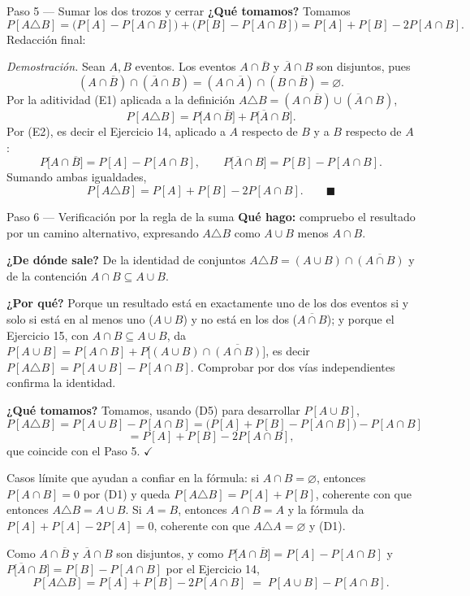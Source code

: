\documentclass[11pt]{article}
\begin{document}
\begin{sol}
\begin{paso}{Paso 5 --- Sumar los dos trozos y cerrar}
\textbf{¿Qué tomamos?} Tomamos
\[
P[A\triangle B]=\big(P[A]-P[A\cap B]\big)+\big(P[B]-P[A\cap B]\big)
=P[A]+P[B]-2P[A\cap B].
\]
Redacción final:

\medskip
\emph{Demostración.} Sean $A,B$ eventos. Los eventos $A\cap\overline{B}$ y $\overline{A}\cap B$
son disjuntos, pues
\[
(A\cap\overline{B})\cap(\overline{A}\cap B)=(A\cap\overline{A})\cap(B\cap\overline{B})=\varnothing .
\]
Por la aditividad (E1) aplicada a la definición
$A\triangle B=(A\cap\overline{B})\cup(\overline{A}\cap B)$,
\[
P[A\triangle B]=P\big[A\cap\overline{B}\big]+P\big[\overline{A}\cap B\big].
\]
Por (E2), es decir el Ejercicio 14, aplicado a $A$ respecto de $B$ y a $B$ respecto de $A$:
\[
P\big[A\cap\overline{B}\big]=P[A]-P[A\cap B],
\qquad
P\big[\overline{A}\cap B\big]=P[B]-P[A\cap B].
\]
Sumando ambas igualdades,
\[
P[A\triangle B]=P[A]+P[B]-2P[A\cap B]. \qquad\blacksquare
\]
\end{paso}

\begin{paso}{Paso 6 --- Verificación por la regla de la suma}
\textbf{Qué hago:} compruebo el resultado por un camino alternativo, expresando $A\triangle B$
como $A\cup B$ menos $A\cap B$.

\textbf{¿De dónde sale?} De la identidad de conjuntos
$A\triangle B=(A\cup B)\cap\overline{(A\cap B)}$ y de la contención $A\cap B\subseteq A\cup B$.

\textbf{¿Por qué?} Porque un resultado está en exactamente uno de los dos eventos si y solo si
está en al menos uno ($A\cup B$) y no está en los dos ($\overline{A\cap B}$); y porque el
Ejercicio 15, con $A\cap B\subseteq A\cup B$, da
$P[A\cup B]=P[A\cap B]+P\big[(A\cup B)\cap\overline{(A\cap B)}\big]$, es decir
$P[A\triangle B]=P[A\cup B]-P[A\cap B]$. Comprobar por dos vías independientes confirma la
identidad.

\textbf{¿Qué tomamos?} Tomamos, usando (D5) para desarrollar $P[A\cup B]$,
\[
P[A\triangle B]=P[A\cup B]-P[A\cap B]
=\big(P[A]+P[B]-P[A\cap B]\big)-P[A\cap B]
\]
\[
=P[A]+P[B]-2P[A\cap B],
\]
que coincide con el Paso 5. $\checkmark$
\end{paso}

\begin{nota}
Casos límite que ayudan a confiar en la fórmula: si $A\cap B=\varnothing$, entonces
$P[A\cap B]=0$ por (D1) y queda $P[A\triangle B]=P[A]+P[B]$, coherente con que entonces
$A\triangle B=A\cup B$. Si $A=B$, entonces $A\cap B=A$ y la fórmula da
$P[A]+P[A]-2P[A]=0$, coherente con que $A\triangle A=\varnothing$ y (D1).
\end{nota}

\end{sol}

\begin{resp}
Como $A\cap\overline{B}$ y $\overline{A}\cap B$ son disjuntos, y como
$P\big[A\cap\overline{B}\big]=P[A]-P[A\cap B]$ y
$P\big[\overline{A}\cap B\big]=P[B]-P[A\cap B]$ por el Ejercicio 14,
\[
\boxed{\;P[A\triangle B]=P[A]+P[B]-2P[A\cap B]\;=\;P[A\cup B]-P[A\cap B].\;}
\]
\end{resp}
\end{document}

